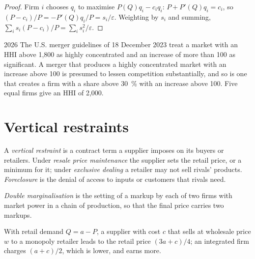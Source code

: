 \begin{proof}
Firm $i$ chooses $q_i$ to maximise $P(Q)q_i - c_i q_i$: $P + P'(Q)q_i = c_i$, so $(P - c_i)/P = -P'(Q)q_i/P = s_i/\varepsilon$. Weighting by $s_i$ and summing,
$\sum_i s_i(P - c_i)/P = \sum_i s_i^2/\varepsilon$.
\end{proof}

\begin{dated}{2026}
The U.S. merger guidelines of 18 December 2023 treat a market with an HHI above 1{,}800 as
highly concentrated and an increase of more than 100 as significant. A merger that
produces a highly concentrated market with an increase above 100 is presumed to
lessen competition substantially, and so is one that creates a firm with a share
above 30~\% with an increase above 100. Five equal firms give an HHI of 2{,}000. %
\end{dated}

\section{Vertical restraints}\label{sec:b3:competition-policy:vertical}

\begin{definition}\label{def:b3:competition-policy:vertical}
A \emph{vertical restraint} is a contract term a supplier imposes on its buyers or
retailers. Under \emph{resale price maintenance} the supplier sets the retail price, or
a minimum for it; under \emph{exclusive dealing} a retailer may not sell rivals'
products. \emph{Foreclosure} is the denial of access to inputs or customers that rivals
need.
\end{definition}

\begin{definition}\label{def:b3:competition-policy:double-marginalisation}
\emph{Double marginalisation} is the setting of a markup by each of two firms with
market power in a chain of production, so that the final price carries two markups.
\end{definition}

\begin{proposition}\label{prop:b3:competition-policy:double-marginalisation}
With retail demand $Q = a - P$, a supplier with cost $c$ that sells at wholesale price $w$ to a monopoly
retailer leads to the retail price $(3a + c)/4$; an integrated firm charges $(a + c)/2$, which is lower, and
earns more.
\end{proposition}

